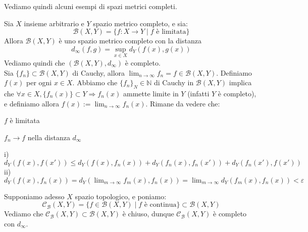 Vediamo quindi alcuni esempi di spazi metrici completi.

\begin{ex}
Sia $X$ insieme arbitrario e $Y$ spazio metrico completo, e sia:
$$\mathcal{B}(X,Y)=\{f:X \longrightarrow Y \mid f \text{ è limitata}\}$$
Allora $\mathcal{B}(X,Y)$ è uno spazio metrico completo con la distanza
$$d_\infty (f,g)=\sup _{x \in X} d_Y(f(x),g(x))$$
Vediamo quindi che $(\mathcal{B}(X,Y),d_\infty)$ è completo.\\
Sia $\{f_n\} \subset \mathcal{B}(X,Y)$ di Cauchy, allora $\displaystyle \lim _{n \rightarrow \infty} f_n=f \in \mathcal{B}(X,Y)$. Definiamo $f(x)$ per ogni $x \in X$. Abbiamo che $\{f_n\}_N \in \mathbb{N}$ di Cauchy in $\mathcal{B}(X,Y)$ implica che $\forall x \in X, \{f_n(x)\} \subset Y \Longrightarrow f_n(x)$ ammette limite in $Y$ (infatti $Y$ è completo), e definiamo allora $\displaystyle f(x):=\lim _{n \rightarrow \infty} f_n(x)$. Rimane da vedere che:
\begin{nlist}
\item $f$ è limitata
\item $f_n \longrightarrow f$ nella distanza $d_\infty$
\end{nlist}
i) $d_Y(f(x),f(x')) \le d_Y(f(x),f_n(x))+d_Y(f_n(x),f_n(x'))+d_Y(f_n(x'),f(x'))$\\
ii) $\displaystyle d_Y(f(x),f_n(x))=d_Y(\lim _{m \rightarrow \infty} f_m(x), f_n(x))=\lim _{m \rightarrow \infty} d_Y(f_m(x),f_n(x))<\varepsilon$
\end{ex}

\begin{ex}
Supponiamo adesso $X$ spazio topologico, e poniamo:
$$\mathcal{C}_{\mathcal{B}}(X,Y)=\{f \in \mathcal{B}(X,Y) \mid f \text{ è continua}\} \subset \mathcal{B}(X,Y)$$
Vediamo che $\mathcal{C}_\mathcal{B}(X,Y) \subset \mathcal{B}(X,Y)$ è chiuso, dunque $\mathcal{C}_\mathcal{B}(X,Y)$ è completo con $d_\infty$.
\end{ex}
